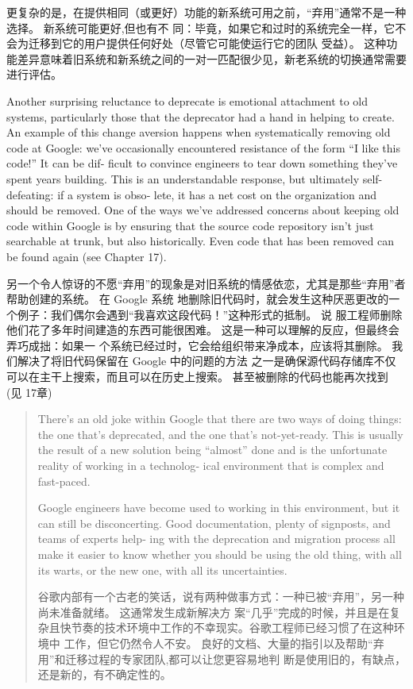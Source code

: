 \documentclass[10pt,a4paper,UTF8]{ctexart}
\begin{document}
更复杂的是，在提供相同（或更好）功能的新系统可用之前，“弃用”通常不是一种选择。 新系统可能更好,但也有不
  同：毕竟，如果它和过时的系统完全一样，它不会为迁移到它的用户提供任何好处（尽管它可能使运行它的团队
  受益）。 这种功能差异意味着旧系统和新系统之间的一对一匹配很少见，新老系统的切换通常需要进行评估。

Another surprising reluctance to deprecate is emotional attachment to old systems, particularly
those that the deprecator had a hand in helping to create. An example of this change aversion
happens when systematically removing old code at Google: we’ve occasionally encountered resistance
of the form “I like this code!” It can be dif‐ ficult to convince engineers to tear down something
they’ve spent years building. This is an understandable response, but ultimately self-defeating: if
a system is obso‐ lete, it has a net cost on the organization and should be removed. One of the ways
we’ve addressed concerns about keeping old code within Google is by ensuring that the source code
repository isn’t just searchable at trunk, but also historically. Even code that has been removed
can be found again (see Chapter 17).

另一个令人惊讶的不愿“弃用”的现象是对旧系统的情感依恋，尤其是那些“弃用”者帮助创建的系统。 在 Google 系统
地删除旧代码时，就会发生这种厌恶更改的一个例子：我们偶尔会遇到“我喜欢这段代码！”这种形式的抵制。 说
服工程师删除他们花了多年时间建造的东西可能很困难。 这是一种可以理解的反应，但最终会弄巧成拙：如果一
个系统已经过时，它会给组织带来净成本，应该将其删除。 我们解决了将旧代码保留在 Google 中的问题的方法
之一是确保源代码存储库不仅可以在主干上搜索，而且可以在历史上搜索。 甚至被删除的代码也能再次找到 (见
17章)

\begin{quote}
There’s an old joke within Google that there are two ways of doing things: the one that’s
deprecated, and the one that’s not-yet-ready. This is usually the result of a new solution being
“almost” done and is the unfortunate reality of working in a technolog‐ ical environment that is
complex and fast-paced.

Google engineers have become used to working in this environment, but it can still be disconcerting.
Good documentation, plenty of signposts, and teams of experts help‐ ing with the deprecation and
migration process all make it easier to know whether you should be using the old thing, with all its
warts, or the new one, with all its uncertainties.

谷歌内部有一个古老的笑话，说有两种做事方式：一种已被“弃用”，另一种尚未准备就绪。 这通常发生成新解决方
案“几乎”完成的时候，并且是在复杂且快节奏的技术环境中工作的不幸现实。谷歌工程师已经习惯了在这种环境中
工作，但它仍然令人不安。 良好的文档、大量的指引以及帮助“弃用”和迁移过程的专家团队,都可以让您更容易地判
断是使用旧的，有缺点，还是新的，有不确定性的。
\end{quote}
\end{document}
